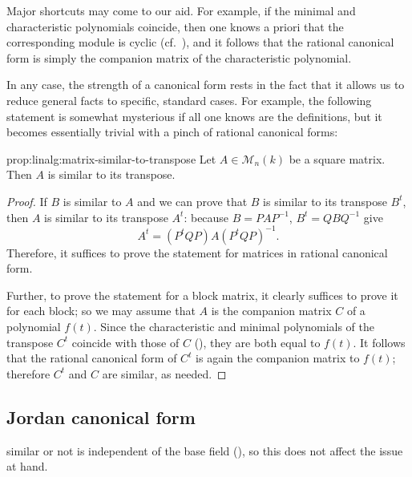 Major shortcuts may come to our aid. For example, if the minimal and
characteristic polynomials coincide, then one knows a priori that the
corresponding module is cyclic (cf.\ ), and it
follows that the rational canonical form is simply the companion
matrix of the characteristic polynomial.

In any case, the strength of a canonical form rests in the fact that
it allows us to reduce general facts to specific, standard cases. For
example, the following statement is somewhat mysterious if all one
knows are the definitions, but it becomes essentially trivial with a
pinch of rational canonical forms:

\begin{prop}{}{prop:linalg:matrix-similar-to-transpose}
  Let $A \in \mathcal{M}_n(k)$ be a square matrix. Then $A$ is similar
  to its transpose.
\end{prop}

\begin{proof}
  If $B$ is similar to $A$ and we can prove that $B$ is similar to its
  transpose $B^t$, then $A$ is similar to its transpose $A^t$: because
  $B = PAP^{-1}$, $B^t = QBQ^{-1}$ give
  \[
    A^t = (P^t Q P) A (P^t Q P)^{-1}.
  \]
  Therefore, it suffices to prove the statement for matrices in
  rational canonical form.

  Further, to prove the statement for a block matrix, it clearly
  suffices to prove it for each block; so we may assume that $A$ is
  the companion matrix $C$ of a polynomial $f(t)$. Since the
  characteristic and minimal polynomials of the transpose $C^t$
  coincide with those of $C$
  (),
  they are both equal to $f(t)$. It follows that the rational
  canonical form of $C^t$ is again the companion matrix to $f(t)$;
  therefore $C^t$ and $C$ are similar, as needed.
\end{proof}

\subsection{Jordan canonical form}
\label{subsec:linalg:jordan-canonical-form}

similar or not is independent of the base field
(), so this
does not affect the issue at hand.


